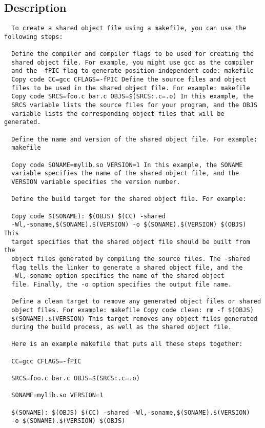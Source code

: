 \documentclass{article}
\begin{document}
\subsection{Description}
\begin{Verbatim}
  To create a shared object file using a makefile, you can use the following steps:

  Define the compiler and compiler flags to be used for creating the
  shared object file. For example, you might use gcc as the compiler
  and the -fPIC flag to generate position-independent code: makefile
  Copy code CC=gcc CFLAGS=-fPIC Define the source files and object
  files to be used in the shared object file. For example: makefile
  Copy code SRCS=foo.c bar.c OBJS=$(SRCS:.c=.o) In this example, the
  SRCS variable lists the source files for your program, and the OBJS
  variable lists the corresponding object files that will be generated.

  Define the name and version of the shared object file. For example:
  makefile

  Copy code SONAME=mylib.so VERSION=1 In this example, the SONAME
  variable specifies the name of the shared object file, and the
  VERSION variable specifies the version number.

  Define the build target for the shared object file. For example:

  Copy code $(SONAME): $(OBJS) $(CC) -shared
  -Wl,-soname,$(SONAME).$(VERSION) -o $(SONAME).$(VERSION) $(OBJS) This
  target specifies that the shared object file should be built from the
  object files generated by compiling the source files. The -shared
  flag tells the linker to generate a shared object file, and the
  -Wl,-soname option specifies the name of the shared object
  file. Finally, the -o option specifies the output file name.

  Define a clean target to remove any generated object files or shared
  object files. For example: makefile Copy code clean: rm -f $(OBJS)
  $(SONAME).$(VERSION) This target removes any object files generated
  during the build process, as well as the shared object file.

  Here is an example makefile that puts all these steps together:

  CC=gcc CFLAGS=-fPIC

  SRCS=foo.c bar.c OBJS=$(SRCS:.c=.o)

  SONAME=mylib.so VERSION=1

  $(SONAME): $(OBJS) $(CC) -shared -Wl,-soname,$(SONAME).$(VERSION)
  -o $(SONAME).$(VERSION) $(OBJS)


\end{Verbatim}
\end{document}
